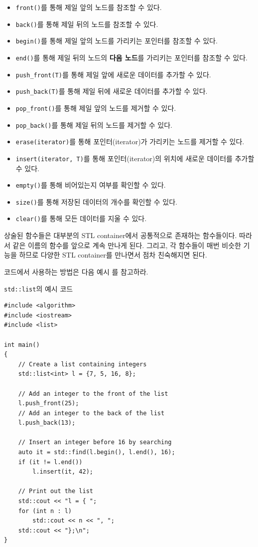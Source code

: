 \begin{itemize}
    \item \texttt{front()}를 통해 제일 앞의 노드를 참조할 수 있다.
    \item \texttt{back()}를 통해 제일 뒤의 노드를 참조할 수 있다.
    \item \texttt{begin()}를 통해 제일 앞의 노드를 가리키는 포인터를 참조할 수 있다.
    \item \texttt{end()}를 통해 제일 뒤의 노드의 \textbf{다음 노드}를 가리키는 포인터를 참조할 수 있다.
    \item \texttt{push\_front(T)}를 통해 제일 앞에 새로운 데이터를 추가할 수 있다.
    \item \texttt{push\_back(T)}를 통해 제일 뒤에 새로운 데이터를 추가할 수 있다.
    \item \texttt{pop\_front()}를 통해 제일 앞의 노드를 제거할 수 있다.
    \item \texttt{pop\_back()}를 통해 제일 뒤의 노드를 제거할 수 있다.
    \item \texttt{erase(iterator)}를 통해 포인터(iterator)가 가리키는 노드를 제거할 수 있다.
    \item \texttt{insert(iterator, T)}를 통해 포인터(iterator)의 위치에 새로운 데이터를 추가할 수 있다.
    \item \texttt{empty()}를 통해 비어있는지 여부를 확인할 수 있다.
    \item \texttt{size()}를 통해 저장된 데이터의 개수를 확인할 수 있다.
    \item \texttt{clear()}를 통해 모든 데이터를 지울 수 있다.
\end{itemize}

상술된 함수들은 대부분의 STL container에서 공통적으로 존재하는 함수들이다. 따라서 같은 이름의 함수를 앞으로 계속 만나게 된다. 그리고, 각 함수들이 매번 비슷한 기능을 하므로 다양한 STL container를 만나면서 점차 친숙해지면 된다.

코드에서 사용하는 방법은 다음 예시 를 참고하라.

\begin{code} \label{code: stl-list-ex}
\texttt{std::list}의 예시 코드
\begin{lstlisting}
#include <algorithm>
#include <iostream>
#include <list>
    
int main()
{
    // Create a list containing integers
    std::list<int> l = {7, 5, 16, 8};
    
    // Add an integer to the front of the list
    l.push_front(25);
    // Add an integer to the back of the list
    l.push_back(13);
    
    // Insert an integer before 16 by searching
    auto it = std::find(l.begin(), l.end(), 16);
    if (it != l.end())
        l.insert(it, 42);
    
    // Print out the list
    std::cout << "l = { ";
    for (int n : l)
        std::cout << n << ", ";
    std::cout << "};\n";
}
\end{lstlisting}
\end{code}

